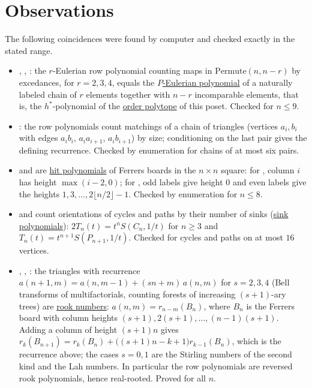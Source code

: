 \section[oeisObservations]{Observations}

The following coincidences were found by computer and checked exactly in the
stated range.

\begin{itemize}
\item {}, , : the $r$-Eulerian row
polynomial counting maps in $\mathrm{Permute}(n,n-r)$ by excedances, for
$r=2,3,4$, equals the \hyperref[naturalLabeling]{$P$-Eulerian polynomial} of a
naturally labeled chain of $r$ elements together with $n-r$ incomparable
elements, that is, the $h^*$-polynomial of the
\hyperref[orderPolytopeDefinition]{order polytope} of this poset.  Checked for
$n\leq 9$.

\item {}: the row polynomials count matchings of a chain of
triangles (vertices $a_i,b_i$ with edges $a_ib_i$, $a_ia_{i+1}$, $a_ib_{i+1}$)
by size; conditioning on the last pair gives the defining recurrence.
Checked by enumeration for chains of at most six pairs.

\item {} and  are
\hyperref[hitPolynomial]{hit polynomials} of Ferrers boards in the $n\times n$
square: for , column $i$ has height $\max(i-2,0)$; for
, odd labels give height $0$ and even labels give the heights
$1,3,\dotsc,2\lfloor n/2\rfloor-1$.  Checked by enumeration for $n\leq 8$.

\item {} and  count orientations of cycles and paths
by their number of sinks (\hyperref[sinkPolynomial]{sink polynomials}):
$2T_n(t)=t^nS(C_n,1/t)$ for $n\geq3$ and $T_n(t)=t^{n+1}S(P_{n+1},1/t)$.
Checked for cycles and paths on at most $16$ vertices.

\item {}, , : the triangles with
recurrence $a(n+1,m)=a(n,m-1)+(sn+m)\,a(n,m)$ for $s=2,3,4$ (Bell transforms of
multifactorials, counting forests of increasing $(s+1)$-ary trees) are
\hyperref[rookPolynomial]{rook numbers}: $a(n,m)=r_{n-m}(B_n)$, where $B_n$ is the
Ferrers board with column heights $(s+1),2(s+1),\dotsc,(n-1)(s+1)$.  Adding a
column of height $(s+1)n$ gives
$r_k(B_{n+1})=r_k(B_n)+\bigl((s+1)n-k+1\bigr)r_{k-1}(B_n)$, which is the
recurrence above; the cases $s=0,1$ are the Stirling numbers of the second kind
and the Lah numbers.  In particular the row polynomials are reversed rook
polynomials, hence real-rooted.  Proved for all $n$.


\end{itemize}
